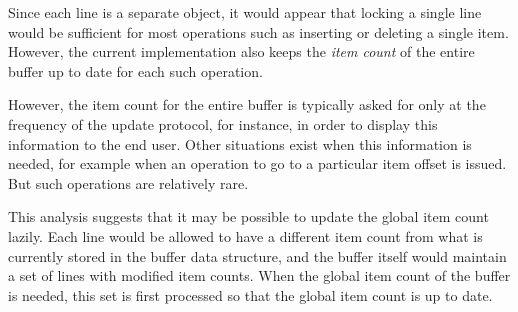 Since each line is a separate object, it would appear that locking a
single line would be sufficient for most operations such as inserting
or deleting a single item.  However, the current implementation also
keeps the \emph{item count} of the entire buffer up to date for each
such operation.

However, the item count for the entire buffer is typically asked for
only at the frequency of the update protocol, for instance, in order
to display this information to the end user.  Other situations exist
when this information is needed, for example when an operation to go
to a particular item offset is issued.  But such operations are
relatively rare.

This analysis suggests that it may be possible to update the global
item count lazily.  Each line would be allowed to have a different
item count from what is currently stored in the buffer data structure,
and the buffer itself would maintain a set of lines with modified item
counts.  When the global item count of the buffer is needed, this set
is first processed so that the global item count is up to date.

